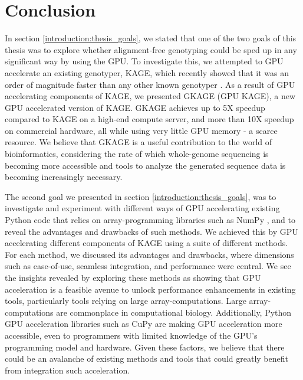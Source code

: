 \section{Conclusion} \label{conclusion}
In section \ref{introduction:thesis_goals}, we stated that one of the two goals of this thesis was to explore whether alignment-free genotyping could be sped up in any significant way by using the GPU.
To investigate this, we attempted to GPU accelerate an existing genotyper, KAGE, which recently showed that it was an order of magnitude faster than any other known genotyper \cite{kage}.
As a result of GPU accelerating components of KAGE, we presented GKAGE (GPU KAGE), a new GPU accelerated version of KAGE.
GKAGE achieves up to 5X speedup compared to KAGE on a high-end compute server, and more than 10X speedup on commercial hardware, all while using very little GPU memory - a scarce resource.
We believe that GKAGE is a useful contribution to the world of bioinformatics, considering the rate of which whole-genome sequencing is becoming more accessible and tools to analyze the generated sequence data is becoming increasingly necessary.

The second goal we presented in section \ref{introduction:thesis_goals}, was to investigate and experiment with different ways of GPU accelerating existing Python code that relies on array-programming libraries such as NumPy \cite{numpy}, and to reveal the advantages and drawbacks of such methods.
We achieved this by GPU accelerating different components of KAGE using a suite of different methods.
For each method, we discussed its advantages and drawbacks, where dimensions such as ease-of-use, seamless integration, and performance were central.
We see the insights revealed by exploring these methods as showing that GPU acceleration is a feasible avenue to unlock performance enhancements in existing tools, particularly tools relying on large array-computations.
Large array-computations are commonplace in computational biology.
Additionally, Python GPU acceleration libraries such as CuPy \cite{cupy} are making GPU acceleration more accessible, even to programmers with limited knowledge of the GPU's programming model and hardware.
Given these factors, we believe that there could be an avalanche of existing methods and tools that could greatly benefit from integration such acceleration.
